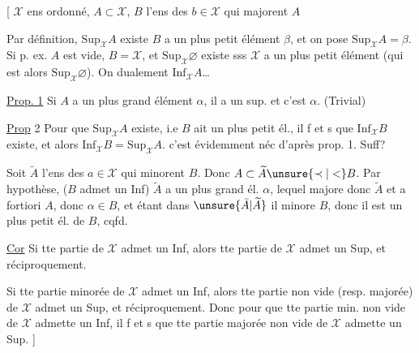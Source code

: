 [ $\mathcal X$ ens ordonné, $A\subset\mathcal X$, $B$ l'ens des $b\in\mathcal X$ qui majorent $A$

\deleted{\unsure{$\exists$}} Par définition, $\mathrm{Sup}_{\mathcal X}A$ existe  $B$ a un plus petit élément $\beta$,
et on pose \deleted{$\unsure{\beta=}$} $\mathrm{Sup}_{\mathcal X}A=\beta$. Si p. ex. $A$ est vide, $B=\mathcal X$, et
$\mathrm{Sup}_{\mathcal X}\varnothing$ existe sss $\mathcal X$ a un plus petit élément (qui
est alors $\mathrm{Sup}_{\mathcal X}\varnothing$). On  dualement $\mathrm{Inf}_{\mathcal X}A$\ldots

\uline{Prop. 1} Si $A$ a un plus grand élément $\alpha$, il a un sup. et c'est $\alpha$. (Trivial)

\uline{Prop} 2 Pour que $\mathrm{Sup}_{\mathcal X}A$ existe, i.e $B$ ait un plus petit
él., il f et s que $\mathrm{Inf}_{\mathcal X}B$ existe, et alors
$\mathrm{Inf}_{\mathcal X}B=\mathrm{Sup}_{\mathcal X}A$. c'est évidemment néc  d'après prop. 1. Suff?

Soit $\widetilde A$ l'ens des $a\in\mathcal X$ qui minorent $B$. Donc
$A\subset\widetilde A\unsure{\prec|<}B$. Par hypothèse, ($B$ admet un Inf) $\widetilde A$ a un
plus grand él. $\alpha$, lequel majore donc $\widetilde A$ et a fortiori
$A$, donc $\alpha\in B$, et étant dans $\unsure{\bar A|\widetilde A}$ il minore $B$, donc il
est un plus petit él. de $B$, cqfd.

\uline{ Cor} Si tte partie de $\mathcal X$ admet un Inf, alors tte
partie de $\mathcal X$ admet un Sup, et réciproquement.

Si tte partie  minorée  de $\mathcal X$ admet un
Inf, alors tte partie non vide (resp. majorée) de
$\mathcal X$ admet un Sup, et réciproquement. Donc
pour que tte partie min. non vide de $\mathcal X$ admette
un Inf, il f et s que tte partie majorée non
vide de $\mathcal X$ admette un Sup. \hfill]
